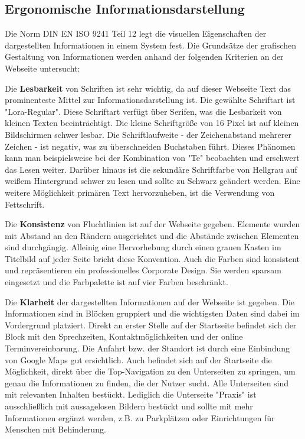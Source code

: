 \subsection{Ergonomische Informationsdarstellung} \label{sec:informationsdarstellung}

Die Norm DIN EN ISO 9241 Teil 12 legt die visuellen Eigenschaften der dargestellten Informationen in einem System fest. Die Grundsätze der grafischen Gestaltung von Informationen werden anhand der folgenden Kriterien an der Webseite untersucht:

Die \textbf{Lesbarkeit} von Schriften ist sehr wichtig, da auf dieser Webseite Text das prominenteste Mittel zur Informationsdarstellung ist. Die gewählte Schriftart ist "Lora-Regular". Diese Schriftart verfügt über Serifen, was die Lesbarkeit von kleinen Texten beeinträchtigt. Die kleine Schriftgröße von 16 Pixel ist auf kleinen Bildschirmen schwer lesbar. Die Schriftlaufweite - der Zeichenabstand mehrerer Zeichen - ist negativ, was zu überschneiden Buchstaben führt. Dieses Phänomen kann man beispielsweise bei der Kombination von "Te" beobachten und erschwert das Lesen weiter. Darüber hinaus ist die sekundäre Schriftfarbe von Hellgrau auf weißem Hintergrund schwer zu lesen und sollte zu Schwarz geändert werden. Eine weitere Möglichkeit primären Text hervorzuheben, ist die Verwendung von Fettschrift.

Die \textbf{Konsistenz} von Fluchtlinien ist auf der Webseite gegeben. Elemente wurden mit Abstand an den Rändern ausgerichtet und die Abstände zwischen Elementen sind durchgängig. Alleinig eine Hervorhebung durch einen grauen Kasten im Titelbild auf jeder Seite bricht diese Konvention. Auch die Farben sind konsistent und repräsentieren ein professionelles Corporate Design. Sie werden sparsam eingesetzt und die Farbpalette ist auf vier Farben beschränkt.

Die \textbf{Klarheit} der dargestellten Informationen auf der Webseite ist gegeben. Die Informationen sind in Blöcken gruppiert und die wichtigsten Daten sind dabei im Vordergrund platziert. Direkt an erster Stelle auf der Startseite befindet sich der Block mit den Sprechzeiten, Kontaktmöglichkeiten und der online Terminvereinbarung. Die Anfahrt bzw. der Standort ist durch eine Einbindung von Google Maps gut ersichtlich. Auch befindet sich auf der Startseite die Möglichkeit, direkt über die Top-Navigation zu den Unterseiten zu springen, um genau die Informationen zu finden, die der Nutzer sucht. Alle Unterseiten sind mit relevanten Inhalten bestückt. Lediglich die Unterseite "Praxis" ist ausschließlich mit aussagelosen Bildern bestückt und sollte mit mehr Informationen ergänzt werden, z.B. zu Parkplätzen oder Einrichtungen für Menschen mit Behinderung.

